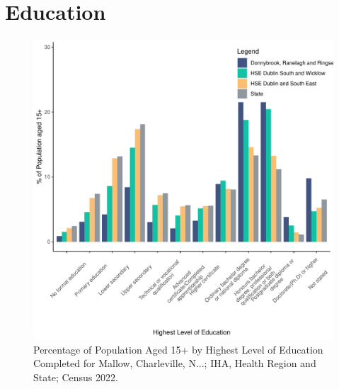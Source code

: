 \documentclass{article}
\begin{document}
\section{Education}\label{sect:Edu}
\begin{figure}[H]
	\centering
	\includegraphics[width = 120mm]{../figures/EduED.pdf}
	\caption{Percentage of Population Aged 15+ by Highest Level of Education Completed for Mallow, Charleville, N...; IHA, Health Region and State; Census 2022.}
	\label{fig:vbnv}
	\end{figure}
\end{document}
